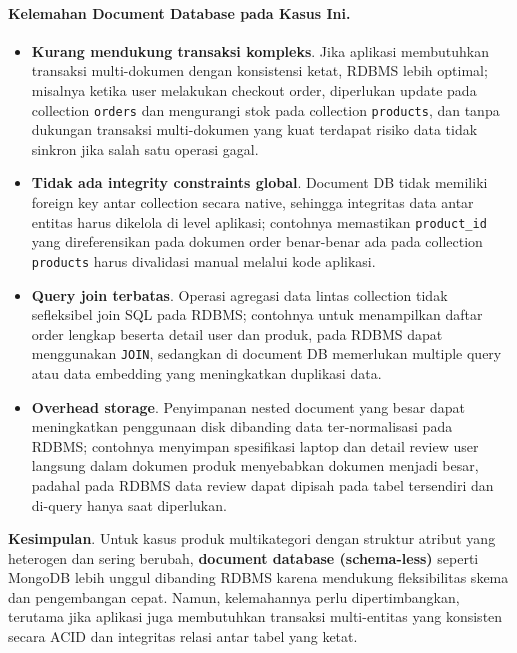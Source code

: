 \paragraph{Kelemahan Document Database pada Kasus Ini.}
\begin{itemize}
	\item \textbf{Kurang mendukung transaksi kompleks}. Jika aplikasi membutuhkan transaksi multi-dokumen dengan konsistensi ketat, RDBMS lebih optimal; misalnya ketika user melakukan checkout order, diperlukan update pada collection \texttt{orders} dan mengurangi stok pada collection \texttt{products}, dan tanpa dukungan transaksi multi-dokumen yang kuat terdapat risiko data tidak sinkron jika salah satu operasi gagal.
	
	\item \textbf{Tidak ada integrity constraints global}. Document DB tidak memiliki foreign key antar collection secara native, sehingga integritas data antar entitas harus dikelola di level aplikasi; contohnya memastikan \texttt{product\_id} yang direferensikan pada dokumen order benar-benar ada pada collection \texttt{products} harus divalidasi manual melalui kode aplikasi.
	
	\item \textbf{Query join terbatas}. Operasi agregasi data lintas collection tidak sefleksibel join SQL pada RDBMS; contohnya untuk menampilkan daftar order lengkap beserta detail user dan produk, pada RDBMS dapat menggunakan \texttt{JOIN}, sedangkan di document DB memerlukan multiple query atau data embedding yang meningkatkan duplikasi data.
	
	\item \textbf{Overhead storage}. Penyimpanan nested document yang besar dapat meningkatkan penggunaan disk dibanding data ter-normalisasi pada RDBMS; contohnya menyimpan spesifikasi laptop dan detail review user langsung dalam dokumen produk menyebabkan dokumen menjadi besar, padahal pada RDBMS data review dapat dipisah pada tabel tersendiri dan di-query hanya saat diperlukan.
\end{itemize}


\textbf{Kesimpulan}. Untuk kasus produk multikategori dengan struktur atribut yang heterogen dan sering berubah, \textbf{document database (schema-less)} seperti MongoDB lebih unggul dibanding RDBMS karena mendukung fleksibilitas skema dan pengembangan cepat. Namun, kelemahannya perlu dipertimbangkan, terutama jika aplikasi juga membutuhkan transaksi multi-entitas yang konsisten secara ACID dan integritas relasi antar tabel yang ketat.



